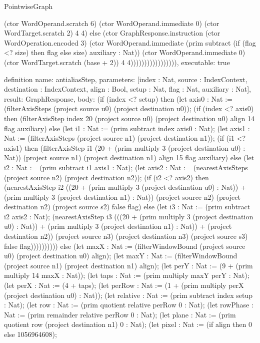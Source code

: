 \begin{lexlean}{PointwiseGraph}
\begin{semanticmodule}
{(ctor WordOperand.scratch 6) (ctor WordOperand.immediate 0) (ctor WordTarget.scratch 2) 4 4) else (ctor GraphResponse.instruction (ctor WordOperation.encoded 3) (ctor WordOperand.immediate (prim subtract (if (flag <? size) then flag else size) auxiliary : Nat)) (ctor WordOperand.immediate 0) (ctor WordTarget.scratch (base + 2)) 4 4))))))))))))))))),
  executable: true
}

definition{
  name: antialiasStep,
  parameters: [index : Nat, source : IndexContext, destination : IndexContext, align : Bool, setup : Nat, flag : Nat, auxiliary : Nat],
  result: GraphResponse,
  body: (if (index <? setup) then (let axis0 : Nat := (filterAxisSteps (project source u0) (project destination u0));
      (if (index <? axis0) then (filterAxisStep index 20 (project source u0) (project destination u0) align 14 flag auxiliary) else (let i1 : Nat := (prim subtract index axis0 : Nat);
      (let axis1 : Nat := (filterAxisSteps (project source n1) (project destination n1));
      (if (i1 <? axis1) then (filterAxisStep i1 (20 + (prim multiply 3 (project destination u0) : Nat)) (project source n1) (project destination n1) align 15 flag auxiliary) else (let i2 : Nat := (prim subtract i1 axis1 : Nat);
      (let axis2 : Nat := (nearestAxisSteps (project source n2) (project destination n2));
      (if (i2 <? axis2) then (nearestAxisStep i2 ((20 + (prim multiply 3 (project destination u0) : Nat)) + (prim multiply 3 (project destination n1) : Nat)) (project source n2) (project destination n2) (project source s2) false flag) else (let i3 : Nat := (prim subtract i2 axis2 : Nat);
      (nearestAxisStep i3 (((20 + (prim multiply 3 (project destination u0) : Nat)) + (prim multiply 3 (project destination n1) : Nat)) + (project destination n2)) (project source n3) (project destination n3) (project source s3) false flag)))))))))) else (let maxX : Nat := (filterWindowBound (project source u0) (project destination u0) align);
      (let maxY : Nat := (filterWindowBound (project source n1) (project destination n1) align);
      (let perY : Nat := (9 + (prim multiply 14 maxX : Nat));
      (let taps : Nat := (prim multiply maxY perY : Nat);
      (let perX : Nat := (4 + taps);
      (let perRow : Nat := (1 + (prim multiply perX (project destination u0) : Nat));
      (let relative : Nat := (prim subtract index setup : Nat);
      (let row : Nat := (prim quotient relative perRow 0 : Nat);
      (let rowPhase : Nat := (prim remainder relative perRow 0 : Nat);
      (let plane : Nat := (prim quotient row (project destination n1) 0 : Nat);
      (let pixel : Nat := (if align then 0 else 1056964608);
}
\end{semanticmodule}
\end{lexlean}
